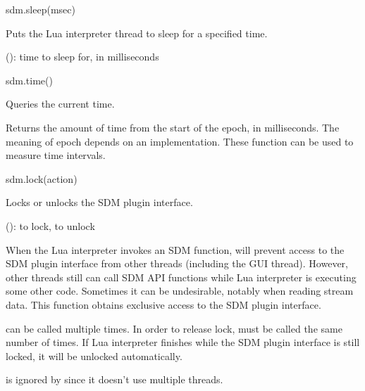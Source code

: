 \documentclass[a4paper,12pt,twoside,extrafontsizes]{memoir}
\begin{document}
\begin{luafuncprototype}
sdm.sleep(msec)
\end{luafuncprototype}

\begin{funcdescr}
	Puts the Lua interpreter thread to sleep for a specified time.
\end{funcdescr}

\begin{funcparams}
	 (): time to sleep for, in milliseconds
\end{funcparams}


\begin{luafuncprototype}
sdm.time()
\end{luafuncprototype}

\begin{funcdescr}
	Queries the current time.
\end{funcdescr}

\begin{funcret}
	Returns the amount of time from the start of the epoch, in milliseconds. The meaning of epoch depends on an implementation. These function can be used to measure time intervals.
\end{funcret}


\begin{luafuncprototype}
sdm.lock(action)
\end{luafuncprototype}

\begin{funcdescr}
	Locks or unlocks the SDM plugin interface.
\end{funcdescr}

\begin{funcparams}
	 ():  to lock,  to unlock
\end{funcparams}

\begin{funcremarks}
	When the Lua interpreter invokes an SDM function,  will prevent access to the SDM plugin interface from other threads (including the GUI thread). However, other threads still can call SDM API functions while Lua interpreter is executing some other code. Sometimes it can be undesirable, notably when reading stream data. This function obtains exclusive access to the SDM plugin interface.
	
	 can be called multiple times. In order to release lock,  must be called the same number of times. If Lua interpreter finishes while the SDM plugin interface is still locked, it will be unlocked automatically.
	
	 is ignored by  since it doesn't use multiple threads.
\end{funcremarks}
\end{document}
